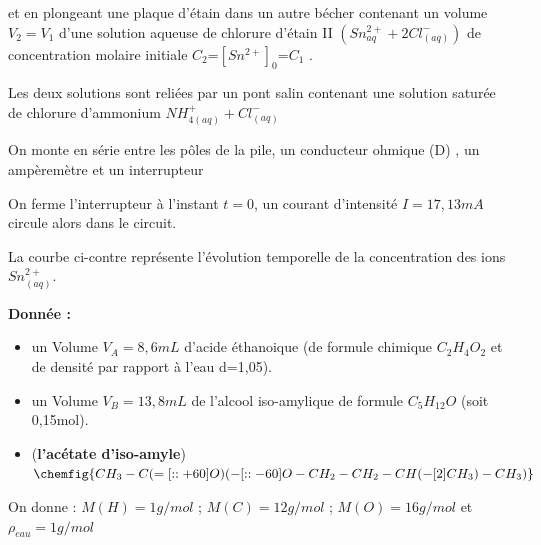 \documentclass[12pt]{article}
\begin{document}
et en plongeant une plaque d’étain dans un autre bécher contenant un volume $V_2=V_1$ d’une solution aqueuse de chlorure d’étain II $(Sn^{2+}_{aq} + 2Cl^-_{(aq)})$
de concentration molaire initiale $C_2 $=$[Sn^{2+}]_0$=$C_1$ . 

Les deux solutions sont reliées par un pont salin contenant une solution saturée de chlorure d’ammonium $NH^+_{4(aq)} + Cl^-_{(aq)}$

On monte en série entre les pôles de la pile, un conducteur ohmique (D) , un ampèremètre et un interrupteur

On ferme l’interrupteur à l’instant $t = 0$, un courant d’intensité $I = 17,13mA$ circule alors dans le circuit.

La courbe ci-contre représente l’évolution temporelle de la concentration des ions $Sn^{2+}_{(aq)}$.

\textbf{Donnée : }

 \begin{itemize}
	 \item un Volume $V_A = 8,6mL$ d'acide éthanoique (de formule chimique $C_2H_4O_2$ et de densité par rapport à l'eau d=1,05).
	 \item un Volume $V_B =13,8mL$ de l'alcool iso-amylique de formule $C_5H_12O$ (soit 0,15mol).
	 \item (\textbf{l'acétate d'iso-amyle})  $\chemfig{CH_3-C(=[::+60]O)(-[::-60]O-CH_2-CH_2-CH(-[2]CH_3)-CH_3)}$

 \end{itemize}

 On donne  : $M(H)=1g/mol$ ; $M(C)=12g/mol$ ; $M(O)=16g/mol$ et $\rho_{eau} = 1g/mol$
\end{document}
